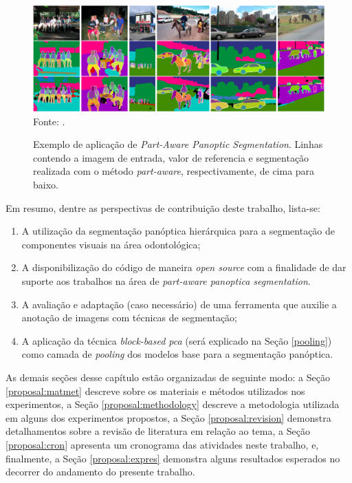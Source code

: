 \begin{figure}[H]
    \centering
    \caption{Exemplo de aplicação de \textit{Part-Aware Panoptic Segmentation}. Linhas contendo a imagem de entrada, valor de referencia e segmentação realizada com o método \textit{part-aware}, respectivamente, de cima para baixo.}
    \includegraphics[width=1\linewidth]{recursos/imagens/proposal/part-aware-example.png}
    \label{proposal:proposal:fig:3}
    Fonte: \cite{DeGeus2021}.
\end{figure}

Em resumo, dentre as perspectivas de contribuição deste trabalho, lista-se:

\begin{enumerate}[I]
  \item A utilização da segmentação panóptica hierárquica para a segmentação de componentes visuais na área odontológica;
  \item A disponibilização do código de maneira \textit{open source} com a finalidade de dar suporte aos trabalhos na área de \textit{part-aware panoptica segmentation}.
  \item A avaliação e adaptação (caso necessário) de uma ferramenta que auxilie a anotação de imagens com técnicas de segmentação;
  \item A aplicação da técnica \textit{block-based pca} \cite{Salvadeo2011} (será explicado na Seção \ref{pooling}) como camada de \textit{pooling} dos modelos base para a segmentação panóptica.
\end{enumerate}

As demais seções desse capítulo estão organizadas de seguinte modo: a Seção \ref{proposal:matmet} descreve sobre os materiais e métodos utilizados nos experimentos, a Seção \ref{proposal:methodology} descreve a metodologia utilizada em alguns dos experimentos propostos, a Seção \ref{proposal:revision} demonstra detalhamentos sobre a revisão de literatura em relação ao tema, a Seção \ref{proposal:cron} apresenta um cronograma das atividades neste trabalho, e, finalmente, a Seção \ref{proposal:expres} demonstra alguns resultados esperados no decorrer do andamento do presente trabalho.


